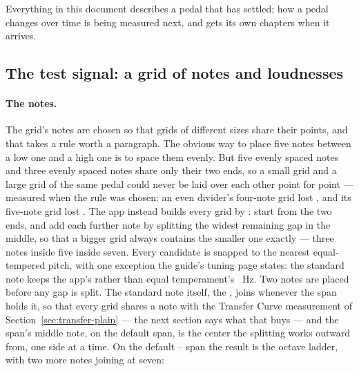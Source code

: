 \documentclass[11pt,a4paper]{article}
\begin{document}
Everything in this document describes a pedal that has settled; how a
pedal changes over time is being measured next, and gets its own chapters
when it arrives.

\subsection{The test signal: a grid of notes and loudnesses}

\paragraph{The notes.} The grid's notes are chosen so that grids of
different sizes share their points, and that takes a rule worth a
paragraph. The obvious way to place five notes between a low one and a
high one is to space them evenly. But five evenly spaced notes and three
evenly spaced notes share only their two ends, so a small grid and a
large grid of the same pedal could never be laid over each other point
for point --- measured when the rule was chosen: an even divider's
four-note grid lost \wmEvenDividerFourLost{}, and its five-note grid lost
\wmEvenDividerFiveLost{}.
The app instead builds every grid by : start from the
two ends, and add each further note by splitting the widest remaining
gap in the middle, so that a bigger grid always contains the smaller one
exactly --- three notes inside five inside seven. Every candidate is
snapped to the nearest equal-tempered pitch, with one exception the
guide's tuning page states: the standard note keeps the app's
\mlatNoteAnchor{} rather than equal temperament's \wmTwelveTETLowHz{}~Hz.
Two notes are placed before any gap is split. The standard note itself,
the , joins whenever the span holds it, so that every
grid shares a note with the Transfer Curve measurement of
Section~\ref{sec:transfer-plain} --- the next section says what that
buys --- and the span's middle note, \wmCentreNote{} on the default span,
is the center the splitting works outward from, one side at a time. On
the default \wmLowNote{}--\wmHighNote{} span the result is the octave
ladder, with two more notes joining at seven:
\begin{center}\small\mlatNoteTable\end{center}
\end{document}
